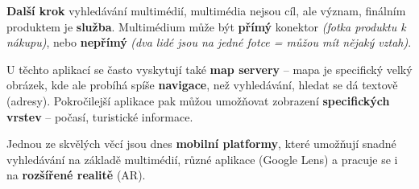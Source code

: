 \textbf{Další krok} vyhledávání multimédií, multimédia nejsou cíl, ale význam, finálním produktem je \textbf{služba}. Multimédium může být \textbf{přímý} konektor \textit{(fotka produktu k nákupu)}, nebo \textbf{nepřímý} \textit{(dva lidé jsou na jedné fotce = můžou mít nějaký vztah)}.

U těchto aplikací se často vyskytují také \textbf{map servery} -- mapa je specifický velký obrázek, kde ale probíhá spíše \textbf{navigace}, než vyhledávání, hledat se dá textově (adresy). Pokročilejší aplikace pak můžou umožňovat zobrazení \textbf{specifických vrstev} -- počasí, turistické informace.

Jednou ze skvělých věcí jsou dnes \textbf{mobilní platformy}, které umožňují snadné vyhledávání na základě multimédií, různé aplikace (Google Lens) a pracuje se i na \textbf{rozšířené realitě} (AR).
